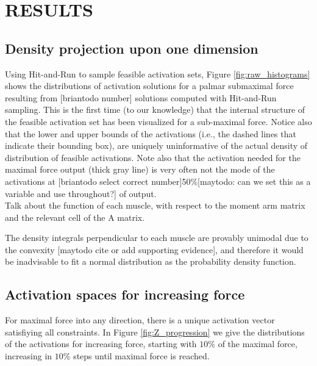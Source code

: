 

\section{RESULTS}
\subsection{Density projection upon one dimension} %
\label{ssub:density_projection_upon_one_dimension}


Using Hit-and-Run to sample feasible activation sets, Figure \ref{fig:raw_histograms} shows the distributions of activation solutions for a palmar submaximal force resulting from [briantodo number] solutions computed with Hit-and-Run sampling. This is the first time (to our knowledge) that the internal structure of the feasible activation set has been visualized for a sub-maximal force.
Notice also that the lower and upper bounds of the activations (i.e., the dashed lines that indicate their bounding box), are uniquely uninformative of the actual density of distribution of feasible activations. Note also that the activation needed for the maximal force output (thick gray line) is very often not the mode of the activations at [briantodo select correct number]50\%[maytodo: can we set this as a variable and use throughout?] of output.
\\

Talk about the function of each muscle, with respect to the moment arm matrix and the relevant cell of the A matrix.

The density integrals perpendicular to each muscle are provably unimodal due to the convexity [maytodo cite or add supporting evidence], and therefore it would be inadvisable to fit a normal distribution as the probability density function.

\subsection{Activation spaces for increasing force} %
\label{sub:activation_spaces_for_increasing_force}
For maximal force into any direction, there is a unique activation vector satisfiying all constraints.
In Figure \ref{fig:Z_progression} we give the distributions of the activations for increasing force, starting with $10\%$ of the maximal force, increasing in $10\%$ steps until maximal force is reached.


